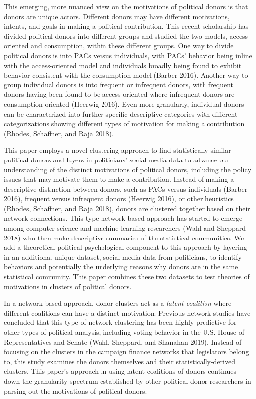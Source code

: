 \documentclass[12pt,]{article}
\begin{document}
This emerging, more nuanced view on the motivations of political donors
is that donors are unique actors. Different donors may have different
motivations, intents, and goals in making a political contribution. This
recent scholarship has divided political donors into different groups
and studied the two models, access-oriented and consumption, within
these different groups. One way to divide political donors is into PACs
versus individuals, with PACs' behavior being inline with the
access-oriented model and individuals broadly being found to exhibit
behavior consistent with the consumption model (Barber 2016). Another
way to group individual donors is into frequent or infrequent donors,
with frequent donors having been found to be access-oriented where
infrequent donors are consumption-oriented (Heerwig 2016). Even more
granularly, individual donors can be characterized into further specific
descriptive categories with different categorizations showing different
types of motivation for making a contribution (Rhodes, Schaffner, and
Raja 2018).

This paper employs a novel clustering approach to find statistically
similar political donors and layers in politicians' social media data to
advance our understanding of the distinct motivations of political
donors, including the policy issues that may motivate them to make a
contribution. Instead of making a descriptive distinction between
donors, such as PACs versus individuals (Barber 2016), frequent versus
infrequent donors (Heerwig 2016), or other heuristics (Rhodes,
Schaffner, and Raja 2018), donors are clustered together based on their
network connections. This type network-based approach has started to
emerge among computer science and machine learning researchers (Wahl and
Sheppard 2018) who then make descriptive summaries of the statistical
communities. We add a theoretical political psychological component to
this approach by layering in an additional unique dataset, social media
data from politicians, to identify behaviors and potentially the
underlying reasons why donors are in the same statistical community.
This paper combines these two datasets to test theories of motivations
in clusters of political donors.

In a network-based approach, donor clusters act as a \emph{latent
coalition} where different coalitions can have a distinct motivation.
Previous network studies have concluded that this type of network
clustering has been highly predictive for other types of political
analysis, including voting behavior in the U.S. House of Representatives
and Senate (Wahl, Sheppard, and Shanahan 2019). Instead of focusing on
the clusters in the campaign finance networks that legislators belong
to, this study examines the donors themselves and their
statistically-derived clusters. This paper's approach in using latent
coalitions of donors continues down the granularity spectrum established
by other political donor researchers in parsing out the motivations of
political donors.
\end{document}
